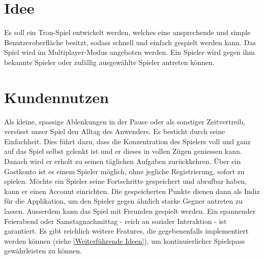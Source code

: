\documentclass[11pt,ngerman]{article}
\begin{document}
    \section{Idee}
	Es soll ein Tron-Spiel entwickelt werden, welches eine ansprechende und simple Benutzeroberfläche besitzt, sodass schnell und einfach gespielt werden kann. Das Spiel wird im Multiplayer-Modus angeboten werden. Ein Spieler wird gegen ihm bekannte Spieler oder zufällig ausgewählte Spieler antreten können.

    \section{Kundennutzen}
    Als kleine, spassige Ablenkungen in der Pause oder als sonstiger Zeitvertreib, versüsst unser Spiel den Alltag des Anwenders. Es besticht durch seine Einfachheit. Dies führt dazu, dass die Konzentration des Spielers voll und ganz auf das Spiel selbst gelenkt ist und er dieses in vollen Zügen geniessen kann. Danach wird er erholt zu seinen täglichen Aufgaben zurückkehren. Über ein Gastkonto ist es einem Spieler möglich, ohne jegliche Registrierung, sofort zu spielen. Möchte ein Spieler seine Fortschritte gespeichert und abrufbar haben, kann er einen Account einrichten. Die gespeicherten Punkte dienen dann als Indiz für die Applikation, um den Spieler gegen ähnlich starke Gegner antreten zu lassen. Ausserdem kann das Spiel mit Freunden gespielt werden. Ein spannender Feierabend oder Samstagnachmittag - reich an sozialer Interaktion - ist garantiert.
    Es gibt reichlich weitere Features, die gegebenenfalls implementiert werden können (siehe \ref{Weiterführende Ideen}), um kontinuierlicher Spielspass gewährleisten zu können.

\end{document}
